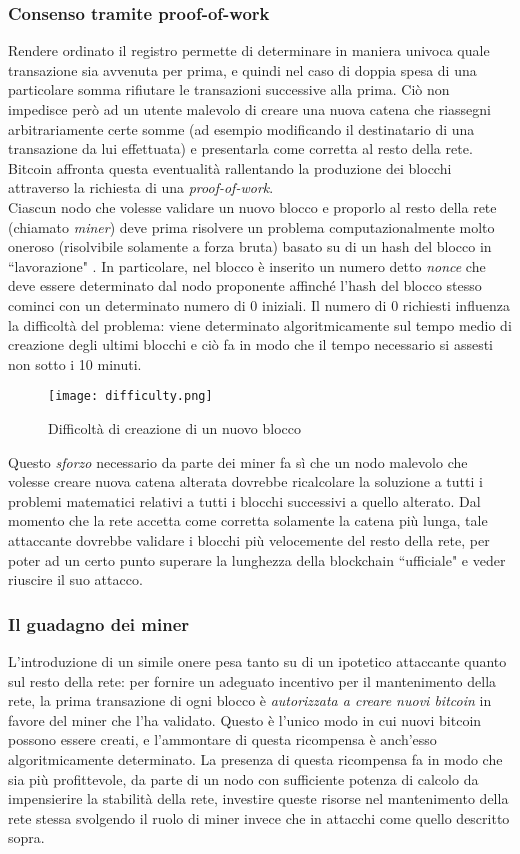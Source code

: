 		\subsubsection{Consenso tramite proof-of-work}
			Rendere ordinato il registro permette di determinare in maniera univoca quale transazione sia avvenuta per prima, e quindi nel caso di doppia spesa di una particolare somma rifiutare le transazioni successive alla prima. Ciò non impedisce però ad un utente malevolo di creare una nuova catena che riassegni arbitrariamente certe somme (ad esempio modificando il destinatario di una transazione da lui effettuata) e presentarla come corretta al resto della rete. Bitcoin affronta questa eventualità rallentando la produzione dei blocchi attraverso la richiesta di una \emph{proof-of-work}. \\
			Ciascun nodo che volesse validare un nuovo blocco e proporlo al resto della rete (chiamato \emph{miner}) deve prima risolvere un problema computazionalmente molto oneroso (risolvibile solamente a forza bruta) basato su di un hash del blocco in ``lavorazione" \cite{hashcash}. In particolare, nel blocco è inserito un numero detto \emph{nonce} che deve essere determinato dal nodo proponente affinché l'hash del blocco stesso cominci con un determinato numero di 0 iniziali. Il numero di 0 richiesti influenza la difficoltà del problema: viene determinato algoritmicamente sul tempo medio di creazione degli ultimi blocchi e ciò fa in modo che il tempo necessario si assesti non sotto i 10 minuti. \\
			\begin{figure}[ht]
				\centering
				\texttt{[image: difficulty.png]}
				\caption{Difficoltà di creazione di un nuovo blocco}
				\label{fig:bitcoin_difficulty}
			\end{figure}
			Questo \emph{sforzo} necessario da parte dei miner fa sì che un nodo malevolo che volesse creare nuova catena alterata dovrebbe ricalcolare la soluzione a tutti i problemi matematici relativi a tutti i blocchi successivi a quello alterato. Dal momento che la rete accetta come corretta solamente la catena più lunga, tale attaccante dovrebbe validare i blocchi più velocemente del resto della rete, per poter ad un certo punto superare la lunghezza della blockchain ``ufficiale" e veder riuscire il suo attacco.
		
		\subsubsection{Il guadagno dei miner}
			L'introduzione di un simile onere pesa tanto su di un ipotetico attaccante quanto sul resto della rete: per fornire un adeguato incentivo per il mantenimento della rete, la prima transazione di ogni blocco è \emph{autorizzata a creare nuovi bitcoin} in favore del miner che l'ha validato. Questo è l'unico modo in cui nuovi bitcoin possono essere creati, e l'ammontare di questa ricompensa è anch'esso algoritmicamente determinato. La presenza di questa ricompensa fa in modo che sia più profittevole, da parte di un nodo con sufficiente potenza di calcolo da impensierire la stabilità della rete, investire queste risorse nel mantenimento della rete stessa svolgendo il ruolo di miner invece che in attacchi come quello descritto sopra.
